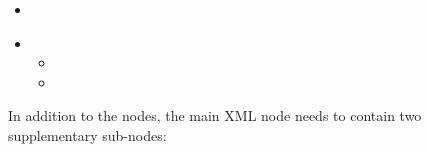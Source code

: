 %
\attrIntro

\begin{itemize}
  \itemsep0em
  \item \nameDescription
\end{itemize}


\begin{itemize}
    \item \variableChildrenIntro
    \begin{itemize}
      \item \distributionDescription
      \item \functionDescription
    \end{itemize}
\end{itemize}

In addition to the  nodes, the main XML node
 needs to contain two supplementary sub-nodes:

